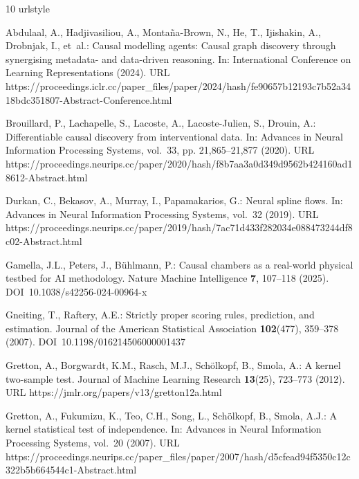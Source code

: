 \documentclass{svproc}
\begin{document}
\begin{thebibliography}{10}
\providecommand{\url}[1]{{#1}}
\providecommand{\urlprefix}{URL }
\expandafter\ifx\csname urlstyle\endcsname\relax
  \providecommand{\doi}[1]{DOI~\discretionary{}{}{}#1}\else
  \providecommand{\doi}{DOI~\discretionary{}{}{}\begingroup
  \urlstyle{rm}\Url}\fi

Abdulaal, A., Hadjivasiliou, A., Monta{\~n}a-Brown, N., He, T., Ijishakin, A.,
  Drobnjak, I., et~al.: Causal modelling agents: Causal graph discovery through
  synergising metadata- and data-driven reasoning.
\newblock In: International Conference on Learning Representations (2024).
\newblock
  \urlprefix\url{https://proceedings.iclr.cc/paper_files/paper/2024/hash/fe90657b12193c7b52a3418bdc351807-Abstract-Conference.html}

Brouillard, P., Lachapelle, S., Lacoste, A., Lacoste-Julien, S., Drouin, A.:
  Differentiable causal discovery from interventional data.
\newblock In: Advances in Neural Information Processing Systems, vol.~33, pp.
  21,865--21,877 (2020).
\newblock
  \urlprefix\url{https://proceedings.neurips.cc/paper/2020/hash/f8b7aa3a0d349d9562b424160ad18612-Abstract.html}

Durkan, C., Bekasov, A., Murray, I., Papamakarios, G.: Neural spline flows.
\newblock In: Advances in Neural Information Processing Systems, vol.~32
  (2019).
\newblock
  \urlprefix\url{https://proceedings.neurips.cc/paper/2019/hash/7ac71d433f282034e088473244df8c02-Abstract.html}

Gamella, J.L., Peters, J., B{\"u}hlmann, P.: Causal chambers as a real-world
  physical testbed for {AI} methodology.
\newblock Nature Machine Intelligence \textbf{7}, 107--118 (2025).
\newblock \doi{10.1038/s42256-024-00964-x}

Gneiting, T., Raftery, A.E.: Strictly proper scoring rules, prediction, and
  estimation.
\newblock Journal of the American Statistical Association \textbf{102}(477),
  359--378 (2007).
\newblock \doi{10.1198/016214506000001437}

Gretton, A., Borgwardt, K.M., Rasch, M.J., Sch{\"o}lkopf, B., Smola, A.: A
  kernel two-sample test.
\newblock Journal of Machine Learning Research \textbf{13}(25), 723--773
  (2012).
\newblock \urlprefix\url{https://jmlr.org/papers/v13/gretton12a.html}

Gretton, A., Fukumizu, K., Teo, C.H., Song, L., Sch{\"o}lkopf, B., Smola, A.J.:
  A kernel statistical test of independence.
\newblock In: Advances in Neural Information Processing Systems, vol.~20
  (2007).
\newblock
  \urlprefix\url{https://proceedings.neurips.cc/paper_files/paper/2007/hash/d5cfead94f5350c12c322b5b664544c1-Abstract.html}


\end{thebibliography}
\end{document}
